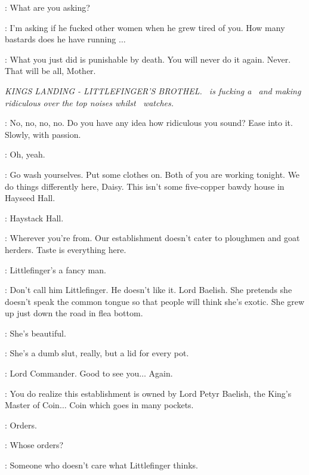 \CERSEI: What are you asking?

\JOFFREY: I'm asking if he fucked other women when he grew tired of you. How many bastards does he have running $\ldots$


\JOFFREY: What you just did is punishable by death. You will never do it again. Never. That will be all, Mother.


\scene

\textit{KINGS LANDING - LITTLEFINGER'S BROTHEL. \DAISY ~is fucking a \MALEPROSTITUTE ~and making ridiculous over the top noises whilst \ROS ~watches.}

\ROS: No, no, no, no. Do you have any idea how ridiculous you sound? Ease into it. Slowly, with passion.

\DAISY:  Oh, yeah.

\ROS: Go wash yourselves. Put some clothes on. Both of you are working tonight. We do things differently here, Daisy. This isn't some five-copper bawdy house in Hayseed Hall.

\DAISY: Haystack Hall.

\ROS: Wherever you're from. Our establishment doesn't cater to ploughmen and goat herders. Taste is everything here.

\DAISY: Littlefinger's a fancy man.

\ROS: Don't call him Littlefinger. He doesn't like it. Lord Baelish.  She pretends she doesn't speak the common tongue so that people will think she's exotic. She grew up just down the road in flea bottom.

\DAISY: She's beautiful.

\ROS: She's a dumb slut, really, but a lid for every pot.


\ROS: Lord Commander. Good to see you$\ldots$ Again.


\ROS: You do realize this establishment is owned by Lord Petyr Baelish, the King's Master of Coin$\ldots$ Coin which goes in many pockets.

\JANOSSLYNT: Orders.

\ROS: Whose orders?

\JANOSSLYNT: Someone who doesn't care what Littlefinger thinks.


